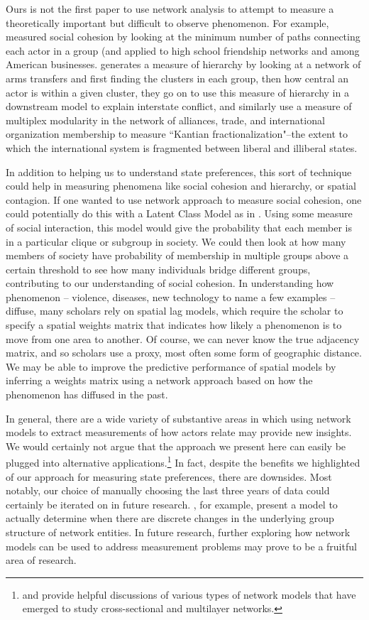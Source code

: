 Ours is not the first paper to use network analysis to attempt to measure a theoretically important but difficult to observe phenomenon. For example, \citet{moody:white:2003} measured social cohesion by looking at the minimum number of paths connecting each actor in a group (and applied to high school friendship networks and among American businesses. \citet{beardsley:etal:2018} generates a measure of hierarchy by looking at a network of arms transfers and first finding the clusters in each group,  then how central an actor is within a given cluster, they go on to use this measure of hierarchy in a downstream model to explain interstate conflict, and similarly \citet{cranmer:etal:2015} use a measure of multiplex modularity in the network of alliances, trade, and international organization membership to measure ``Kantian fractionalization"--the extent to which the international system is fragmented between liberal and illiberal states.

In addition to helping us to understand state preferences, this sort of technique could help in measuring phenomena like social cohesion and hierarchy, or spatial contagion. If one wanted to use network approach to measure social cohesion, one could potentially do this with a Latent Class Model as in \citet{airoldi:etal:2008}. Using some measure of social interaction, this model would give the probability that each member is in a particular clique or subgroup in society. We could then look at how many members of society have probability of membership in multiple groups above a certain threshold to see how many individuals bridge different groups, contributing to our understanding of social cohesion. In understanding how phenomenon -- violence, diseases, new technology to name a few examples -- diffuse, many scholars rely on spatial lag models, which require the scholar to specify a spatial weights matrix that indicates how likely a phenomenon is to move from one area to another. Of course, we can never know the true adjacency matrix, and so scholars use a proxy, most often some form of geographic distance. We may be able to improve the predictive performance of spatial models by inferring a weights matrix using a network approach based on how the phenomenon has diffused in the past.

In general, there are a wide variety of substantive areas in which using network models to extract measurements of how actors relate may provide new insights. We would certainly not argue that the approach we present here can easily be plugged into alternative applications.\footnote{\citet{goldenberg:etal:2010} and \citet{kim:etal:2018} provide helpful discussions of various types of network models that have emerged to study cross-sectional and multilayer networks.} In fact, despite the benefits we highlighted of our approach for measuring state preferences, there are downsides. Most notably, our choice of manually choosing the last three years of data could certainly be iterated on in future research. \citet{park:sohn:2017}, for example, present a model to actually determine when there are discrete changes in the underlying group structure of network entities. In future research, further exploring how network models can be used to address measurement problems may prove to be a fruitful area of research.

